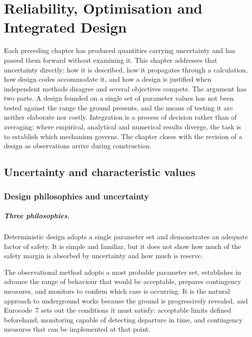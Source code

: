 \chapter{Reliability, Optimisation and Integrated Design}
\label{ch:integrated-design}

Each preceding chapter has produced quantities carrying uncertainty and has
passed them forward without examining it. This chapter addresses that
uncertainty directly: how it is described, how it propagates through a
calculation, how design codes accommodate it, and how a design is justified
when independent methods disagree and several objectives compete. The argument
has two parts. A design founded on a single set of parameter values has not
been tested against the range the ground presents, and the means of
testing it are neither elaborate nor costly. Integration is a
process of decision rather than of averaging: where empirical, analytical and
numerical results diverge, the task is to establish which mechanism governs.
The chapter closes with the revision of a design as observations arrive
during construction.

\section{Uncertainty and characteristic values}
\label{sec:uncertainty-and-characteristic-values}

\subsection{Design philosophies and uncertainty}
\label{sec:design-philosophies-and-uncertainty}

\paragraph{Three philosophies.}
Deterministic design adopts a single parameter set and demonstrates an
adequate factor of safety. It is simple and familiar, but it does not show how
much of the safety margin is absorbed by uncertainty and how much is reserve.

The observational method adopts a most probable parameter set, establishes in
advance the range of behaviour that would be acceptable, prepares contingency
measures, and monitors to confirm which case is occurring. It is the natural
approach to underground works because the ground is progressively revealed,
and Eurocode~7 sets out the conditions it must satisfy: acceptable limits
defined beforehand, monitoring capable of detecting departure in time, and
contingency measures that can be implemented at that point.

